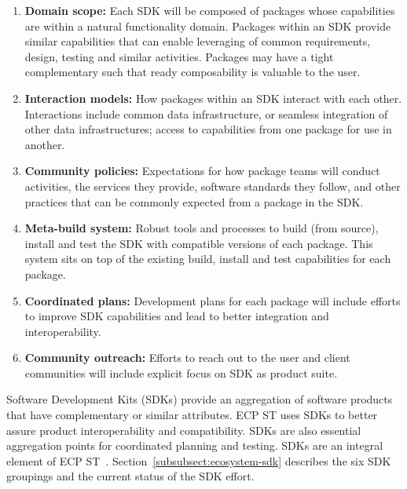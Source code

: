 \begin{table}
	\begin{mdframed}
\begin{enumerate}
	\item \textbf{Domain scope:} Each SDK will be composed of packages whose capabilities are within a natural functionality domain. Packages within an SDK provide similar capabilities that can enable leveraging of common requirements, design, testing and similar activities. Packages may have a tight complementary such that ready composability is valuable to the user.
	\item \textbf{Interaction models:} How packages within an SDK interact with each other. Interactions include common data infrastructure, or seamless integration of other data infrastructures; access to capabilities from one package for use in another.
	\item \textbf{Community policies:} Expectations for how package teams will conduct activities, the services they provide, software standards they follow, and other practices that can be commonly expected from a package in the SDK.
	\item \textbf{Meta-build system:} Robust tools and processes to build (from source), install and test the SDK with compatible versions of each package. This system sits on top of the existing build, install and test capabilities for each package.
	\item \textbf{Coordinated plans:} Development plans for each package will include efforts to improve SDK capabilities and lead to better integration and interoperability.
	\item \textbf{Community outreach:} Efforts to reach out to the user and client communities will include explicit focus on SDK as product suite.
\end{enumerate}
	\end{mdframed}
\caption{\label{table:sdk-attributes} Software Development Kits (SDKs) provide an aggregation of software products that have complementary or similar attributes.  ECP ST uses SDKs to better assure product interoperability and compatibility.  SDKs are also essential aggregation points for coordinated planning and testing. SDKs are an integral element of ECP ST~\cite{Heroux-SDK-Podcast}.  Section~\ref{subsubsect:ecosystem-sdk} describes the six SDK groupings and the current status of the SDK effort.}
\end{table}

